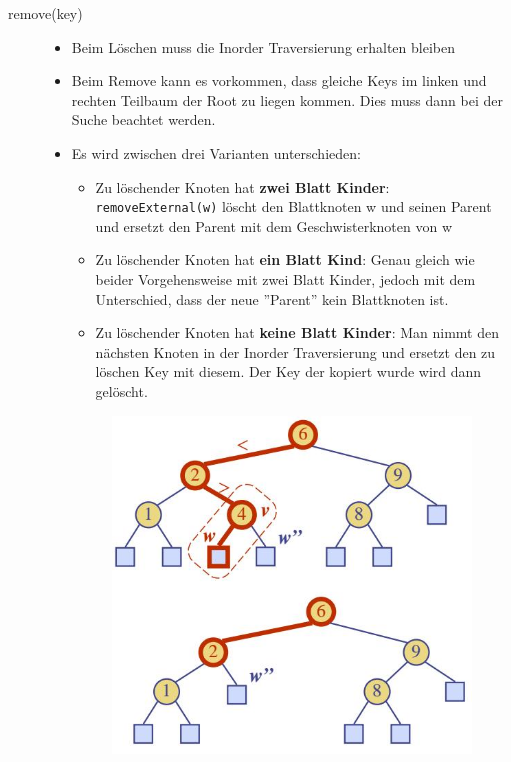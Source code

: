 \begin{description}
	\item[remove(key)] \hfill
	\label{sec:bstremove}
	\begin{itemize}
		\item Beim Löschen muss die Inorder Traversierung erhalten bleiben
		\item Beim Remove kann es vorkommen, dass gleiche Keys im linken und rechten Teilbaum der Root zu liegen kommen. Dies muss dann bei der Suche beachtet werden.
		\item Es wird zwischen drei Varianten unterschieden:
		\begin{itemize}
			\item Zu löschender Knoten hat \textbf{zwei Blatt Kinder}: \lstinline|removeExternal(w)| löscht den Blattknoten w und seinen Parent und ersetzt den Parent mit dem Geschwisterknoten von w
			\item Zu löschender Knoten hat \textbf{ein Blatt Kind}: Genau gleich wie beider Vorgehensweise mit zwei Blatt Kinder, jedoch mit dem Unterschied, dass der neue ''Parent'' kein Blattknoten ist.
			\item Zu löschender Knoten hat \textbf{keine Blatt Kinder}:  Man nimmt den nächsten Knoten in der Inorder Traversierung und ersetzt den zu löschen Key mit diesem. Der Key der kopiert wurde wird dann gelöscht.
		\end{itemize}
		\begin{figure}[ht!]
			\centering
			\begin{minipage}[t]{0.4\textwidth}
				\centering
				\includegraphics[width=0.9\linewidth]{images/search_tree_delete_1}

\end{minipage}
\end{figure}
\end{itemize}
\end{description}
